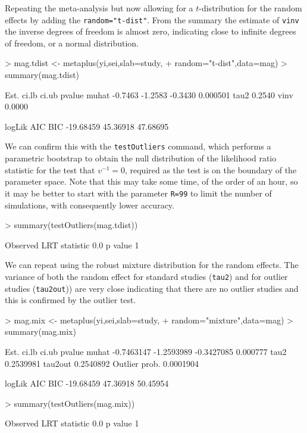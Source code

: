 \documentclass{article}
\begin{document}
Repeating the meta-analysis but now allowing for a $t$-distribution for the random effects by adding the \texttt{random="t-dist"}. From the summary the estimate of \texttt{vinv} the inverse degrees of freedom is almost zero, indicating close to infinite degrees of freedom, or a normal distribution.
\begin{Schunk}
\begin{Sinput}
> mag.tdist <- metaplus(yi,sei,slab=study,
+         random="t-dist",data=mag)
> summary(mag.tdist)
\end{Sinput}
\begin{Soutput}
         Est.   ci.lb   ci.ub   pvalue
muhat -0.7463 -1.2583 -0.3430 0.000501
tau2   0.2540                         
vinv   0.0000                         

     logLik      AIC      BIC
  -19.68459 45.36918 47.68695
\end{Soutput}
\end{Schunk}

We can confirm this with the \texttt{testOutliers} command, which performs a parametric bootstrap to obtain the null distribution of the likelihood ratio statistic for the test that $v^{-1}=0$, required as the test is on the boundary of the parameter space. Note that this may take some time, of the order of an hour, so it may be better to start with the parameter \texttt{R=99} to limit the number of simulations, with consequently lower accuracy.
\begin{Schunk}
\begin{Sinput}
> summary(testOutliers(mag.tdist))
\end{Sinput}
\begin{Soutput}
Observed LRT statistic 0.0 p value 1
\end{Soutput}
\end{Schunk}

We can repeat using the robust mixture distribution for the random effects. The variance of both the random effect for standard studies (\texttt{tau2}) and for outlier studies (\texttt{tau2out})) are very close indicating that there are no outlier studies and this is confirmed by the outlier test.

\begin{Schunk}
\begin{Sinput}
> mag.mix <- metaplus(yi,sei,slab=study,
+       random="mixture",data=mag)
> summary(mag.mix)
\end{Sinput}
\begin{Soutput}
                    Est.      ci.lb      ci.ub   pvalue
muhat         -0.7463147 -1.2593989 -0.3427085 0.000777
tau2           0.2539981                               
tau2out        0.2540892                               
Outlier prob.  0.0001904                               

     logLik      AIC      BIC
  -19.68459 47.36918 50.45954
\end{Soutput}
\begin{Sinput}
> summary(testOutliers(mag.mix))
\end{Sinput}
\begin{Soutput}
Observed LRT statistic 0.0 p value 1
\end{Soutput}
\end{Schunk}
\end{document}

